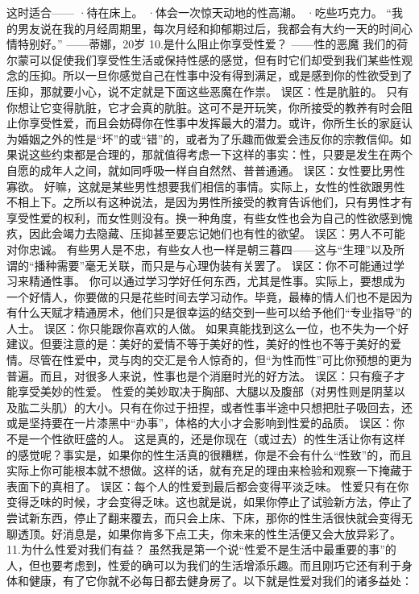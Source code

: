 \documentclass[12pt,UTF8,openany]{ctexbook}
\begin{document}
这时适合——
·待在床上。
·体会一次惊天动地的性高潮。
·吃些巧克力。
“我的男友说在我的月经周期里，每次月经和抑郁期过后，我都会有大约一天的时间心情特别好。”
——蒂娜，20岁
10.是什么阻止你享受性爱？
——性的恶魔
我们的荷尔蒙可以促使我们享受性生活或保持性感的感觉，但有时它们却受到我们某些性观念的压抑。所以一旦你感觉自己在性事中没有得到满足，或是感到你的性欲受到了压抑，那就要小心，说不定就是下面这些恶魔在作祟。
误区：性是肮脏的。
只有你想让它变得肮脏，它才会真的肮脏。这可不是开玩笑，你所接受的教养有时会阻止你享受性爱，而且会妨碍你在性事中发挥最大的潜力。或许，你所生长的家庭认为婚姻之外的性是“坏”的或“错”的，或者为了乐趣而做爱会违反你的宗教信仰。如果说这些约束都是合理的，那就值得考虑一下这样的事实：性，只要是发生在两个自愿的成年人之间，就如同呼吸一样自自然然、普普通通。
误区：女性要比男性寡欲。
好嘛，这就是某些男性想要我们相信的事情。实际上，女性的性欲跟男性不相上下。之所以有这种说法，是因为男性所接受的教育告诉他们，只有男性才有享受性爱的权利，而女性则没有。换一种角度，有些女性也会为自己的性欲感到愧疚，因此会竭力去隐藏、压抑甚至要忘记她们也有性的欲望。
误区：男人不可能对你忠诚。
有些男人是不忠，有些女人也一样是朝三暮四——这与“生理”以及所谓的“播种需要”毫无关联，而只是与心理伪装有关罢了。
误区：你不可能通过学习来精通性事。
你可以通过学习学好任何东西，尤其是性事。实际上，要想成为一个好情人，你要做的只是花些时间去学习动作。毕竟，最棒的情人们也不是因为有什么天赋才精通房术，他们只是很幸运的结交到一些可以给予他们“专业指导”的人士。
误区：你只能跟你喜欢的人做。
如果真能找到这么一位，也不失为一个好建议。但要注意的是：美好的爱情不等于美好的性，美好的性也不等于美好的爱情。尽管在性爱中，灵与肉的交汇是令人惊奇的，但“为性而性”可比你预想的更为普遍。而且，对很多人来说，性事也是个消磨时光的好方法。
误区：只有瘦子才能享受美妙的性爱。
性爱的美妙取决于胸部、大腿以及腹部（对男性则是阴茎以及肱二头肌）的大小。只有在你过于扭捏，或者性事半途中只想把肚子吸回去，还或是坚持要在一片漆黑中“办事”，体格的大小才会影响到性爱的品质。
误区：你不是一个性欲旺盛的人。
这是真的，还是你现在（或过去）的性生活让你有这样的感觉呢？事实是，如果你的性生活真的很糟糕，你是不会有什么“性致”的，而且实际上你可能根本就不想做。这样的话，就有充足的理由来检验和观察一下掩藏于表面下的真相了。
误区：每个人的性爱到最后都会变得平淡乏味。
性爱只有在你变得乏味的时候，才会变得乏味。这也就是说，如果你停止了试验新方法，停止了尝试新东西，停止了翻来覆去，而只会上床、下床，那你的性生活很快就会变得无聊透顶。好消息是，如果你肯多下点工夫，你未来的性生活便又会大放异彩了。
11.为什么性爱对我们有益？
虽然我是第一个说“性爱不是生活中最重要的事”的人，但也要考虑到，性爱的确可以为我们的生活增添乐趣。而且刚巧它还有利于身体和健康，有了它你就不必每日都去健身房了。以下就是性爱对我们的诸多益处：
\end{document}
